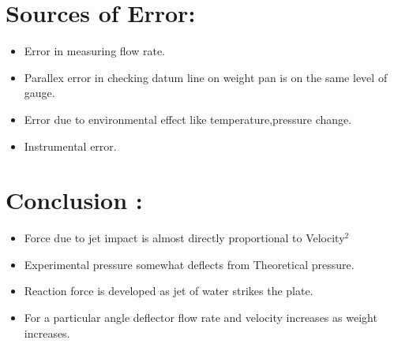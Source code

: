 \documentclass[12pt,a4paper]{article}
\begin{document}
\section{Sources of Error:}
\begin{itemize}
    \item Error in measuring flow rate.
    \item Parallex error in checking datum line on weight pan is on the same level of gauge.
    \item Error due to environmental effect like temperature,pressure change.
    \item Instrumental error.
\end{itemize}



\section{Conclusion :}
\begin{itemize}
    \item Force due to jet impact is almost directly proportional to Velocity$^{2}$ 
    \item Experimental pressure somewhat deflects from Theoretical pressure.
    \item Reaction force is developed as jet of water strikes the plate.
    \item For a particular angle deflector flow rate and velocity increases as weight increases. 
\end{itemize}
\end{document}
